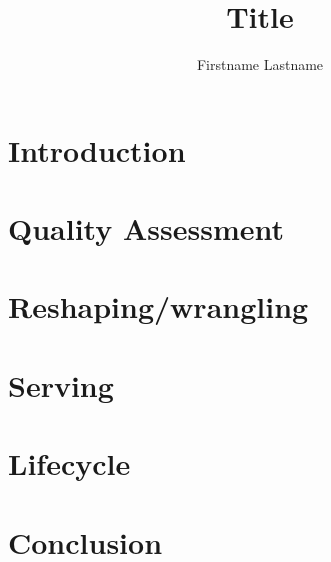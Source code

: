 \documentclass[sigconf]{acmart}
\begin{document}
\title[]{Title}

\author{Firstname Lastname}

\renewcommand{\shortauthors}{Firstname Lastname}

\begin{abstract}
  \lipsum[0-1]
\end{abstract}

\maketitle

\section{Introduction}
\lipsum[1-2]

\section{Quality Assessment}
\lipsum[2-3]

\section{Reshaping/wrangling}
\lipsum[3-4]

\section{Serving}
\lipsum[4-5]

\section{Lifecycle}
\lipsum[5-6]

\section{Conclusion}
\lipsum[6-8]
\end{document}

